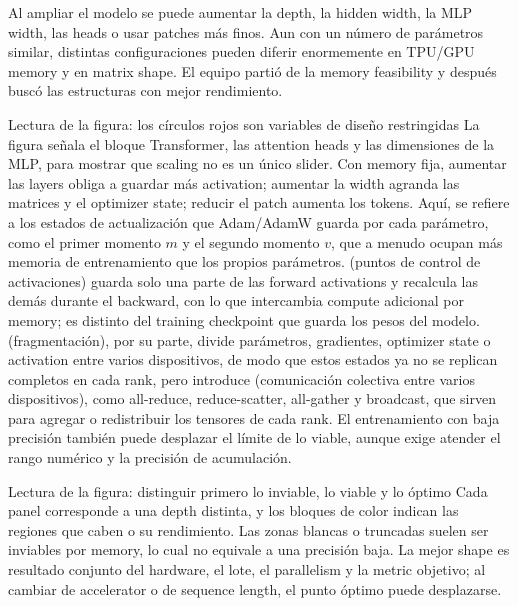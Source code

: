 Al ampliar el modelo se puede aumentar la depth, la hidden width, la MLP width, las heads o usar patches más finos. Aun con un número de parámetros similar, distintas configuraciones pueden diferir enormemente en TPU/GPU memory y en matrix shape. El equipo partió de la memory feasibility y después buscó las estructuras con mejor rendimiento.


\begin{knowledgebox}{Lectura de la figura: los círculos rojos son variables de diseño restringidas}
La figura señala el bloque Transformer, las attention heads y las dimensiones de la MLP, para mostrar que scaling no es un único slider. Con memory fija, aumentar las layers obliga a guardar más activation; aumentar la width agranda las matrices y el optimizer state; reducir el patch aumenta los tokens. Aquí,  se refiere a los estados de actualización que Adam/AdamW guarda por cada parámetro, como el primer momento $m$ y el segundo momento $v$, que a menudo ocupan más memoria de entrenamiento que los propios parámetros.  (puntos de control de activaciones) guarda solo una parte de las forward activations y recalcula las demás durante el backward, con lo que intercambia compute adicional por memory; es distinto del training checkpoint que guarda los pesos del modelo.  (fragmentación), por su parte, divide parámetros, gradientes, optimizer state o activation entre varios dispositivos, de modo que estos estados ya no se replican completos en cada rank, pero introduce  (comunicación colectiva entre varios dispositivos), como all-reduce, reduce-scatter, all-gather y broadcast, que sirven para agregar o redistribuir los tensores de cada rank. El entrenamiento con baja precisión también puede desplazar el límite de lo viable, aunque exige atender el rango numérico y la precisión de acumulación.
\end{knowledgebox}


\begin{knowledgebox}{Lectura de la figura: distinguir primero lo inviable, lo viable y lo óptimo}
Cada panel corresponde a una depth distinta, y los bloques de color indican las regiones que caben o su rendimiento. Las zonas blancas o truncadas suelen ser inviables por memory, lo cual no equivale a una precisión baja. La mejor shape es resultado conjunto del hardware, el lote, el parallelism y la metric objetivo; al cambiar de accelerator o de sequence length, el punto óptimo puede desplazarse.
\end{knowledgebox}

